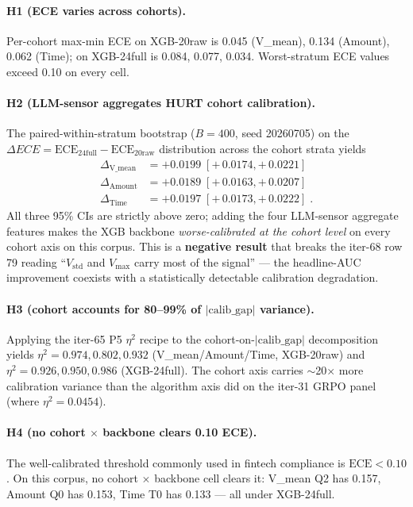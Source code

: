 \paragraph{H1 (ECE varies across cohorts).}
Per-cohort max-min ECE on XGB-20raw is 0.045 (V\_mean), 0.134 (Amount),
0.062 (Time); on XGB-24full is 0.084, 0.077, 0.034. Worst-stratum ECE values
exceed 0.10 on every cell.

\paragraph{H2 (LLM-sensor aggregates HURT cohort calibration).}
The paired-within-stratum bootstrap ($B=400$, seed 20260705) on the
$\Delta ECE = \mathrm{ECE}_{\mathrm{24full}} - \mathrm{ECE}_{\mathrm{20raw}}$
distribution across the cohort strata yields
\begin{align*}
  \Delta_{\text{V\_mean}} &= +0.0199 \; [+\,0.0174, +\,0.0221] \\
  \Delta_{\text{Amount}} &= +0.0189 \; [+\,0.0163, +\,0.0207] \\
  \Delta_{\text{Time}}   &= +0.0197 \; [+\,0.0173, +\,0.0222] \; .
\end{align*}
All three 95\% CIs are strictly above zero; adding the four LLM-sensor
aggregate features makes the XGB backbone \emph{worse-calibrated at the
cohort level} on every cohort axis on this corpus. This is a
\textbf{negative result} that breaks the iter-68 row 79 reading ``$V_{\text{std}}$
and $V_{\max}$ carry most of the signal'' --- the headline-AUC improvement
coexists with a statistically detectable calibration degradation.

\paragraph{H3 (cohort accounts for 80--99\% of $|\mathrm{calib\_gap}|$ variance).}
Applying the iter-65 P5 $\eta^2$ recipe to the cohort-on-$|\mathrm{calib\_gap}|$
decomposition yields $\eta^2 = 0.974, 0.802, 0.932$ (V\_mean/Amount/Time, XGB-20raw)
and $\eta^2 = 0.926, 0.950, 0.986$ (XGB-24full). The cohort axis carries
$\sim$20$\times$ more calibration variance than the algorithm axis did on the
iter-31 GRPO panel (where $\eta^2 = 0.0454$).

\paragraph{H4 (no cohort $\times$ backbone clears 0.10 ECE).}
The well-calibrated threshold commonly used in fintech compliance is
$\mathrm{ECE} < 0.10$. On this corpus, no cohort $\times$ backbone cell
clears it: V\_mean Q2 has 0.157, Amount Q0 has 0.153, Time T0 has 0.133 --- all
under XGB-24full.

